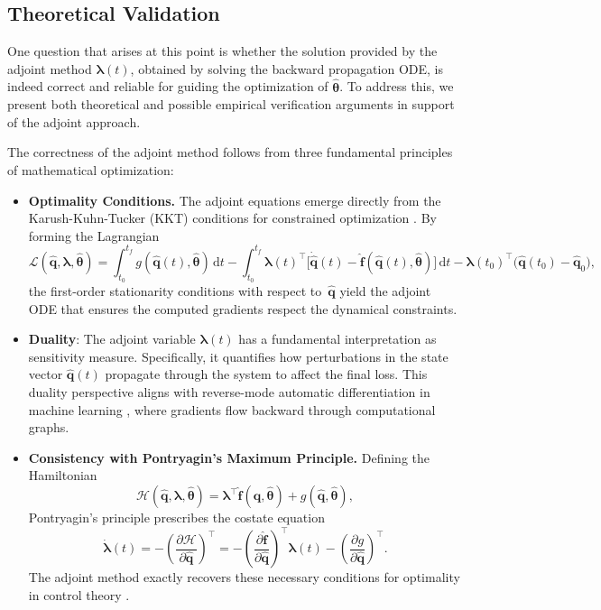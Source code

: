 \subsection*{Theoretical Validation}

One question that arises at this point is whether the solution provided by the adjoint method $\bm{\lambda}(t)$, obtained by solving the backward propagation ODE, is indeed correct and reliable for guiding the optimization of $\hat{\bm{\theta}}$. To address this, we present both theoretical and possible empirical verification arguments in support of the adjoint approach.

The correctness of the adjoint method follows from three fundamental principles of mathematical optimization:

\begin{itemize}
    \item \textbf{Optimality Conditions.}  The adjoint equations emerge directly from the Karush-Kuhn-Tucker (KKT) conditions for constrained optimization \cite{nocedal1999numerical}. By forming the Lagrangian\\
    $$\mathscr{L}(\hat{\mathbf{q}}, \bm{\lambda}, \hat{\bm{\theta}}) 
    = \int_{t_0}^{t_f} g(\hat{\mathbf{q}}(t),\hat{\bm{\theta}}) \,\mathrm{d}t
      - \int_{t_0}^{t_f} \bm{\lambda}(t)^\top \bigl[\dot{\hat{\mathbf{q}}}(t)-\hat{\mathbf{f}}(\hat{\mathbf{q}}(t),\hat{\bm{\theta}})\bigr]\,\mathrm{d}t
      - \bm{\lambda}(t_0)^\top \bigl(\hat{\mathbf{q}}(t_0)-\hat{\mathbf{q}}_0\bigr) ,$$
  the first-order stationarity conditions with respect to~$\hat{\mathbf{q}}$ yield the adjoint ODE that ensures the computed gradients respect the dynamical constraints.
    
    \item \textbf{Duality}: The adjoint variable $\bm{\lambda}(t)$ has a fundamental interpretation as sensitivity measure. Specifically, it quantifies how perturbations in the state vector $\hat{\mathbf{q}}(t)$ propagate through the system to affect the final loss. This duality perspective aligns with reverse-mode automatic differentiation in machine learning \cite{chen2018neural}, where gradients flow backward through computational graphs.

    \item \textbf{Consistency with Pontryagin's Maximum Principle.}  Defining the Hamiltonian\\
  $$\mathcal{H}(\hat{\mathbf{q}}, \bm{\lambda}, \hat{\bm{\theta}}) 
      = \bm{\lambda}^\top \hat{\mathbf{f}}(\hat{\mathbf{q}}, \hat{\bm{\theta}}) 
      + g(\hat{\mathbf{q}}, \hat{\bm{\theta}}),$$
  Pontryagin's principle prescribes the costate equation\\
  $$\dot{\bm{\lambda}}(t) 
      = - \left(\frac{\partial \mathcal{H}}{\partial \hat{\mathbf{q}}} \right)^{\top}
      = - \left(\frac{\partial \hat{\mathbf{f}}}{\partial \hat{\mathbf{q}}} \right)^{\top}\bm{\lambda}(t) -  \left(\frac{\partial g}{\partial \hat{\mathbf{q}}} \right)^{\top}.$$
  The adjoint method exactly recovers these necessary conditions for optimality in control theory \cite{liberzon2011calculus}.
\end{itemize}

